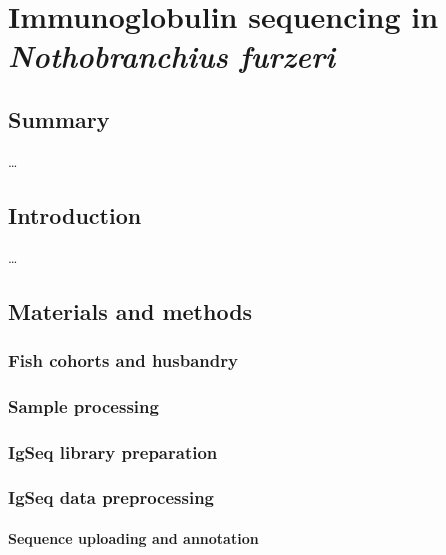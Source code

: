 
\chapter{Immunoglobulin sequencing in \textit{Nothobranchius furzeri}}  
\onehalfspacing

\section*{Summary} 

\dots
\pagebreak


\section{Introduction}

\dots

\section{Materials and methods}

\subsection{Fish cohorts and husbandry}


\subsection{Sample processing}


\subsection{IgSeq library preparation}

\subsection{IgSeq data preprocessing}


\subsubsection{Sequence uploading and annotation}


